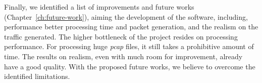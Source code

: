 Finally, we identified a list of improvements and future works (Chapter~\ref{ch:future-work}), aiming the development of the software, including, performance better processing time and packet generation, and the realism on the traffic generated. The higher bottleneck of the project resides on processing performance. For processing huge \textit{pcap} files, it still takes a prohibitive amount of time. The results on realism, even with much room for improvement, already have a good quality. With the proposed future works, we believe to overcome the identified limitations.

